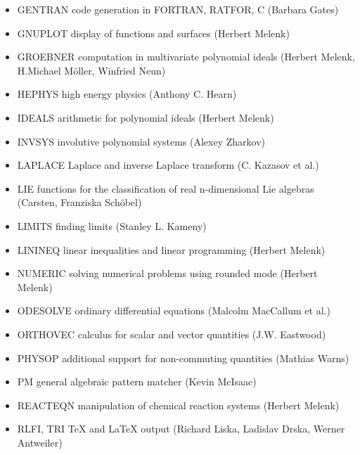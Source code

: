 \begin{itemize}
\item GENTRAN  code generation in FORTRAN, RATFOR, C (Barbara Gates)
 
\item GNUPLOT  display of functions and surfaces (Herbert Melenk)

\item GROEBNER computation in multivariate polynomial ideals
         (Herbert Melenk, H.Michael M\"oller, Winfried Neun)
 
\item HEPHYS  high energy physics (Anthony C. Hearn)

\item IDEALS  arithmetic for polynomial ideals (Herbert Melenk)

\item INVSYS involutive polynomial systems (Alexey Zharkov)

\item LAPLACE  Laplace and inverse Laplace transform (C. Kazasov et al.)

\item LIE  functions for the classification of real n-dimensional Lie
algebras (Carsten, Franziska Sch\"obel)

\item LIMITS  finding limits (Stanley L. Kameny)

\item LININEQ  linear inequalities and linear programming (Herbert Melenk)

\item NUMERIC  solving numerical problems using rounded mode (Herbert Melenk)

\item ODESOLVE ordinary differential equations (Malcolm MacCallum et al.)
 
\item ORTHOVEC calculus for scalar and vector quantities
         (J.W. Eastwood)
 
\item PHYSOP additional support for non-commuting quantities (Mathias Warns)

\item PM  general algebraic pattern matcher (Kevin McIsaac)

\item REACTEQN  manipulation of chemical reaction systems (Herbert Melenk)

\item RLFI, TRI  TeX and LaTeX output (Richard Liska, Ladislav Drska,
Werner Antweiler)


\end{itemize}
